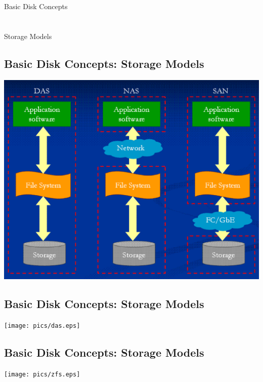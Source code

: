 \documentclass[xga]{xdvislides}
\begin{document}
\newpage
\vspace*{\fill}
\begin{center}
	\Hugesize
		Basic Disk Concepts \\ [1em]
	\hspace*{5mm}
	\blueline\\
	\hspace*{5mm}\\
		Storage Models
\end{center}
\vspace*{\fill}

\subsection{Basic Disk Concepts: Storage Models}
	\begin{center}
		\includegraphics[scale=0.57]{pics/das-nas-san.eps} \\
	\end{center}

\subsection{Basic Disk Concepts: Storage Models}
\begin{center}
	\texttt{[image: pics/das.eps]} \\
\end{center}

\subsection{Basic Disk Concepts: Storage Models}
\begin{center}
	\texttt{[image: pics/zfs.eps]} \\
\end{center}
\end{document}
